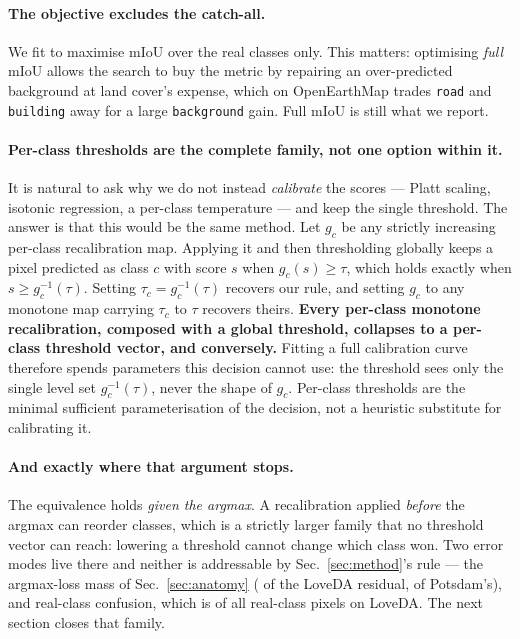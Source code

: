 \documentclass[10pt,a4paper]{article}                        %
\newcommand{\best}[1]{\textbf{#1}}
\newcommand{\bg}{\texttt{background}}
\begin{document}
\paragraph{The objective excludes the catch-all.} We fit to maximise mIoU over
the real classes only. This matters: optimising \emph{full} mIoU allows the search
to buy the metric by repairing an over-predicted background at land cover's
expense, which on OpenEarthMap trades \texttt{road} and \texttt{building} away for
a large \bg{} gain. Full mIoU is still what we report.

\paragraph{Per-class thresholds are the complete family, not one option within it.}
It is natural to ask why we do not instead \emph{calibrate} the scores --- Platt
scaling, isotonic regression, a per-class temperature --- and keep the single
threshold. The answer is that this would be the same method. Let $g_c$ be any
strictly increasing per-class recalibration map. Applying it and then thresholding
globally keeps a pixel predicted as class $c$ with score $s$ when $g_c(s)\ge\tau$,
which holds exactly when $s\ge g_c^{-1}(\tau)$. Setting $\tau_c=g_c^{-1}(\tau)$
recovers our rule, and setting $g_c$ to any monotone map carrying $\tau_c$ to $\tau$
recovers theirs. \best{Every per-class monotone recalibration, composed with a global
threshold, collapses to a per-class threshold vector, and conversely.} Fitting a full
calibration curve therefore spends parameters this decision cannot use: the threshold
sees only the single level set $g_c^{-1}(\tau)$, never the shape of $g_c$. Per-class
thresholds are the minimal sufficient parameterisation of the decision, not a
heuristic substitute for calibrating it.

\paragraph{And exactly where that argument stops.} The equivalence holds \emph{given
the argmax}. A recalibration applied \emph{before} the argmax can reorder classes,
which is a strictly larger family that no threshold vector can reach: lowering a
threshold cannot change which class won. Two error modes live there and neither is
addressable by Sec.~\ref{sec:method}'s rule --- the argmax-loss mass of
Sec.~\ref{sec:anatomy} (\mechB{} of the LoveDA residual, \mechBpots{} of Potsdam's),
and real-class confusion, which is \confusionShare{} of all real-class pixels on
LoveDA. The next section closes that family.
\end{document}
